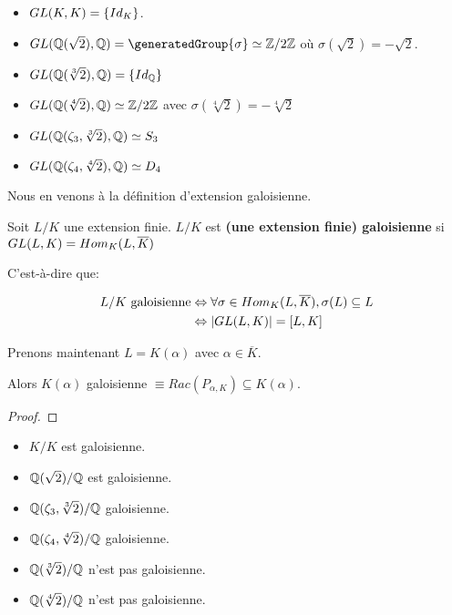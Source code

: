 \begin{exemple} [Exercice]
	\begin{itemize}
		\item $GL(K, K) = \left\{ Id_{K} \right\}$.
		\item $\galoisGroup{\rational(\sqrt{2})}{\rational} =
			\generatedGroup{\sigma} \isomorph
			\integer/2\integer$ où $\sigma(\sqrt{2}) = - \sqrt{2}$.
		\item $GL(\mathbb{Q}(\sqrt[3]{2}), \mathbb{Q}) =
			\left\{ Id_{\mathbb{Q}} \right\}$
		\item $GL(\mathbb{Q}(\sqrt[4]{2}), \mathbb{Q}) \simeq
			\mathbb{Z}/2\mathbb{Z}$ avec $\sigma(\sqrt[4]{2}) = - \sqrt[4]{2}$
		\item $GL(\mathbb{Q}(\zeta_{3}, \sqrt[3]{2}), \mathbb{Q})
			\simeq S_{3}$
		\item $GL(\mathbb{Q}(\zeta_{4}, \sqrt[4]{2}), \mathbb{Q})
			\simeq D_{4}$
	\end{itemize}
\end{exemple}

Nous en venons à la définition d'extension galoisienne.

\begin{definition}
	Soit $L/K$ une extension finie.
	$L/K$ est \textbf{(une extension finie) galoisienne} si $GL(L, K) =
	Hom_{K}(L, \overline{K})$
\end{definition}

C'est-à-dire que:

\begin{align*}
	L/K \text{ galoisienne}
	& \Leftrightarrow \forall \sigma \in Hom_{K}(L, \overline{K}), \sigma(L) \subseteq L \\
	& \Leftrightarrow |GL(L, K)| = [L, K]
\end{align*}

\begin{proposition}
	Prenons maintenant $L = K(\alpha)$ avec $\alpha \in \overline{K}$.

	Alors $K(\alpha)$ galoisienne $\equiv Rac(P_{\alpha, K}) \subseteq K(\alpha)$.
\end{proposition}

\ifdefined\outputproof
\begin{proof}

\end{proof}
\fi

\begin{exemple} [Exercice]
	\begin{itemize}
		\item $K/K$ est galoisienne.
		\item $\mathbb{Q}(\sqrt{2})/\mathbb{Q}$ est galoisienne.
		\item $\mathbb{Q}(\zeta_{3}, \sqrt[3]{2})/\mathbb{Q}$ galoisienne.
		\item $\mathbb{Q}(\zeta_{4}, \sqrt[4]{2})/\mathbb{Q}$ galoisienne.
		\item $\mathbb{Q}(\sqrt[3]{2})/\mathbb{Q}$ n'est pas galoisienne.
		\item $\mathbb{Q}(\sqrt[4]{2})/\mathbb{Q}$ n'est pas galoisienne.
	\end{itemize}
\end{exemple}

